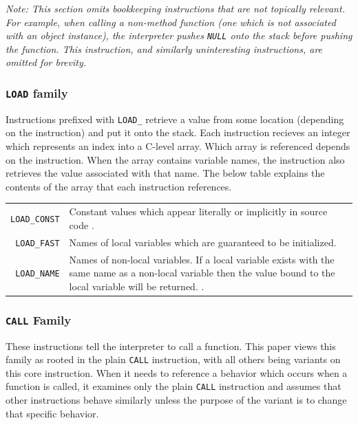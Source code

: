 \textit{Note: This section omits bookkeeping instructions that are not topically relevant.
For example, when calling a non-method function (one which is not associated with an
object instance), the interpreter pushes \texttt{NULL} onto the stack before pushing the
function.
This instruction, and similarly uninteresting instructions, are omitted for brevity.}

\subsubsection{\texttt{LOAD} family}
Instructions prefixed with \texttt{LOAD\_} retrieve a value from some location (depending
on the instruction) and put it onto the stack.
Each instruction recieves an integer which represents an index into a C-level array.
Which array is referenced depends on the instruction.
When the array contains variable names, the instruction also retrieves the value
associated with that name.
The below table explains the contents of the array that each instruction references.

\begin{tabularx}{\columnwidth}{r X}
	\texttt{LOAD\_CONST}  &
		Constant values which appear literally or implicitly in source code
		\parencite[][Doc/library/dis.rst lines 964-966]{python-source}. \\
	\texttt{LOAD\_FAST}   &
		Names of local variables which are guaranteed to be initialized.
		\parencite[][Doc/library/dis.rst lines 1253-1259,
		             Lib/inspect.py line 514
		]{python-source} \\
	\texttt{LOAD\_NAME}   &
		Names of non-local variables.
		If a local variable exists with the same name as a non-local variable then the value
		bound to the local variable will be returned.
		\parencite[][Doc/library/dis.rst lines 969-972,
		             Lib/inspect.py line 511
		]{python-source}. \\
\end{tabularx}

\subsubsection{\texttt{CALL} Family}

These instructions tell the interpreter to call a function.
This paper views this family as rooted in the plain \texttt{CALL} instruction, with all
others being variants on this core instruction.
When it needs to reference a behavior which occurs when a function is called, it examines
only the plain \texttt{CALL} instruction and assumes that other instructions behave
similarly unless the purpose of the variant is to change that specific behavior.

